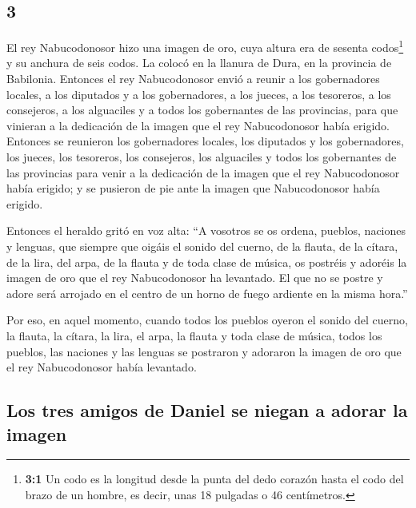 \begin{paracol}{2}
\hypertarget{section-4}{%
\section{3}\label{section-4}}

 El rey Nabucodonosor hizo una imagen de oro, cuya altura
era de sesenta codos\footnote{\textbf{3:1} Un codo es la longitud desde
  la punta del dedo corazón hasta el codo del brazo de un hombre, es
  decir, unas 18 pulgadas o 46 centímetros.} y su anchura de seis codos.
La colocó en la llanura de Dura, en la provincia de Babilonia.
 Entonces el rey Nabucodonosor envió a reunir a los
gobernadores locales, a los diputados y a los gobernadores, a los
jueces, a los tesoreros, a los consejeros, a los alguaciles y a todos
los gobernantes de las provincias, para que vinieran a la dedicación de
la imagen que el rey Nabucodonosor había erigido. 
Entonces se reunieron los gobernadores locales, los diputados y los
gobernadores, los jueces, los tesoreros, los consejeros, los alguaciles
y todos los gobernantes de las provincias para venir a la dedicación de
la imagen que el rey Nabucodonosor había erigido; y se pusieron de pie
ante la imagen que Nabucodonosor había erigido.

 Entonces el heraldo gritó en voz alta: ``A vosotros se os
ordena, pueblos, naciones y lenguas,  que siempre que
oigáis el sonido del cuerno, de la flauta, de la cítara, de la lira, del
arpa, de la flauta y de toda clase de música, os postréis y adoréis la
imagen de oro que el rey Nabucodonosor ha levantado.  El
que no se postre y adore será arrojado en el centro de un horno de fuego
ardiente en la misma hora.''

 Por eso, en aquel momento, cuando todos los pueblos
oyeron el sonido del cuerno, la flauta, la cítara, la lira, el arpa, la
flauta y toda clase de música, todos los pueblos, las naciones y las
lenguas se postraron y adoraron la imagen de oro que el rey
Nabucodonosor había levantado.

\hypertarget{los-tres-amigos-de-daniel-se-niegan-a-adorar-la-imagen}{%
\subsection{Los tres amigos de Daniel se niegan a adorar la
imagen}\label{los-tres-amigos-de-daniel-se-niegan-a-adorar-la-imagen}}


\end{paracol}
